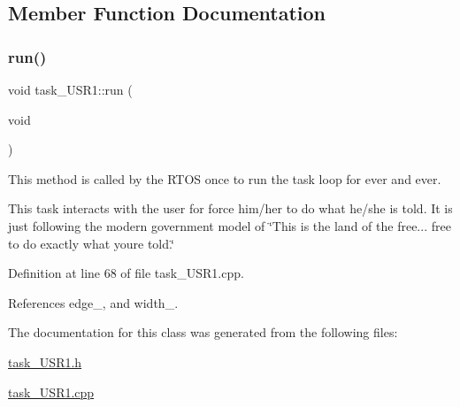 \subsection{Member Function Documentation}
\mbox{\label{classtask__USR1_a95b84a7b7f293a56470b74eb541fe346}} 
\subsubsection{\texorpdfstring{run()}{run()}}
{\footnotesize\ttfamily void task\+\_\+\+U\+S\+R1\+::run (\begin{DoxyParamCaption}\item[{void}]{ }\end{DoxyParamCaption})}

This method is called by the R\+T\+OS once to run the task loop for ever and ever.

This task interacts with the user for force him/her to do what he/she is told. It is just following the modern government model of \char`\"{}\+This is the land of the free...
free to do exactly what you\textquotesingle{}re told.\char`\"{} 

Definition at line 68 of file task\+\_\+\+U\+S\+R1.\+cpp.



References edge\+\_, and width\+\_.



The documentation for this class was generated from the following files\+:\begin{DoxyCompactItemize}
\item 
\mbox{\hyperlink{task__USR1_8h}{task\+\_\+\+U\+S\+R1.\+h}}\item 
\mbox{\hyperlink{task__USR1_8cpp}{task\+\_\+\+U\+S\+R1.\+cpp}}\end{DoxyCompactItemize}
